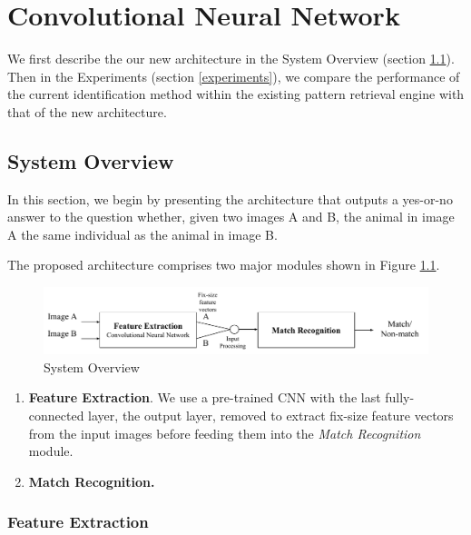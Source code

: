 \graphicspath{{./images/chap7/}}
\chapter{Convolutional Neural Network}

We first describe the our new architecture in the System Overview (section \ref{system}). Then in the Experiments (section \ref{experiments}), we compare the performance of the current identification method within the existing pattern retrieval engine with that of the new architecture.

\section{System Overview} \label{system}

In this section, we begin by presenting the architecture that outputs a yes-or-no answer to the question whether, given two images A and B, the animal in image A the same individual as the animal in image B.

The proposed architecture comprises two major modules shown in Figure \ref{fig:overview}.

\begin{figure}[h]
  \centering
  \includegraphics[width=\textwidth]{system/overview}
  \caption{System Overview}
  \label{fig:overview}
\end{figure}

\begin{enumerate}
  \item \textbf{Feature Extraction}. We use a pre-trained CNN with the last fully-connected layer, the output layer, removed to extract fix-size feature vectors from the input images before feeding them into the \emph{Match Recognition} module.
  \item \textbf{Match Recognition.}
\end{enumerate}

\subsection{Feature Extraction} 

